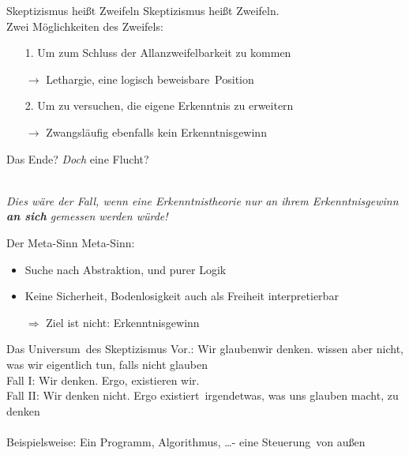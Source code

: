 \documentclass[12pt]{beamer}
\begin{document}
\begin{frame}{Skeptizismus heißt Zweifeln}
Skeptizismus heißt Zweifeln.\\
Zwei Möglichkeiten des Zweifels:
\begin{itemize}
\item[1.] Um zum Schluss der Allanzweifelbarkeit zu kommen\\
\item[$\rightarrow$] Lethargie, eine logisch \glqq beweisbare\grqq\ Position
\item[2.] Um zu versuchen, die eigene Erkenntnis zu erweitern
\item[$\rightarrow$] Zwangsläufig ebenfalls kein Erkenntnisgewinn
\end{itemize}
\end{frame}

\begin{frame}{Das Ende?}
\emph{Doch} eine Flucht?\\
\ \\
\begin{center}
\emph{Dies wäre der Fall, wenn eine Erkenntnistheorie nur an ihrem Erkenntnisgewinn \textbf{an sich} gemessen werden würde!}
\end{center}
\end{frame}

\begin{frame}{Der Meta-Sinn}
Meta-Sinn:
\begin{itemize}
\item Suche nach Abstraktion, und purer Logik
\item Keine Sicherheit, Bodenlosigkeit auch als Freiheit interpretierbar
\item[$\Rightarrow$] Ziel ist nicht: Erkenntnisgewinn
\end{itemize}
\end{frame}


\begin{frame}{Das \glqq Universum\grqq\ des Skeptizismus}
Vor.: Wir \glqq glauben\grqq wir denken. wissen aber nicht, was wir eigentlich tun, falls nicht \glqq glauben\grqq \\
Fall \RN{1}: Wir denken. Ergo, existieren \glqq wir\grqq . \\
Fall \RN{2}: Wir denken nicht. Ergo \glqq existiert\grqq\ irgendetwas, was uns glauben macht, zu denken\\
\ \\
Beispielsweise: Ein Programm, Algorithmus, \ldots - eine \glqq Steuerung\grqq\ von \glqq außen\grqq
\end{frame}
\end{document}
